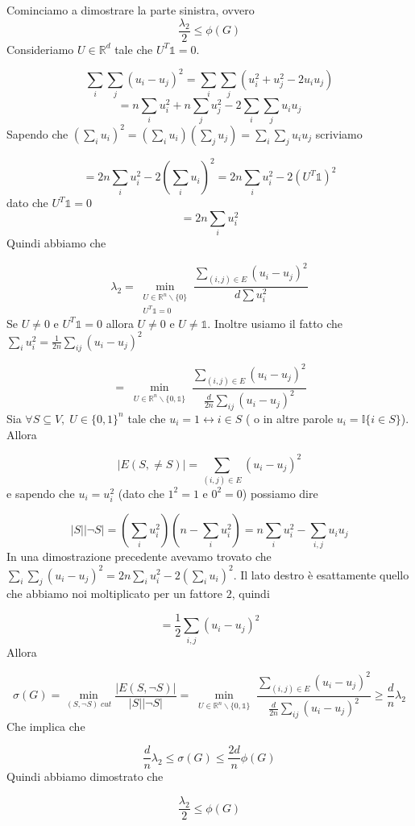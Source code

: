 \documentclass[12pt]{report}
\begin{document}
\begin{dimo}
Cominciamo a dimostrare la parte sinistra, ovvero $$\frac{\lambda_2}{2} \leq \phi(G)$$
Consideriamo $U \in \mathbb{R}^d $ tale che $U^T \mathds{1} = 0$.

$$\sum_i \sum_j (u_i - u_j)^2 = \sum_i \sum_j (u_i^2 + u_j^2 - 2u_i u_j)$$
$$= n \sum_i u_i^2 + n \sum_j u_j^2 - 2 \sum_i \sum_j u_i u_j$$
Sapendo che $(\sum_i u_i)^2 = (\sum_i u_i) (\sum_j u_j) = \sum_i \sum_j u_i u_j$ scriviamo

$$= 2n \sum_i u_i^2 - 2(\sum_i u_i)^2  = 2n \sum_i u_i^2 - 2(U^T \mathds{1})^2 $$
dato che $U^T \mathds{1} = 0$
$$= 2n \sum_i u_i^2$$
Quindi abbiamo che 

$$\lambda_2 = \min_{\substack{U \in \mathbb{R}^n \backslash \{0\} \\ U^T \mathds{1} = 0}} \frac{\sum_{(i,j) \in E} (u_i - u_j)^2}{d \sum u_i^2} $$
Se $U \neq 0$ e $U^T \mathds{1} = 0$ allora $U \neq 0$ e $U \neq \mathds{1}$. Inoltre usiamo il fatto che $\sum_i u_i^2 = \frac{1}{2n} \sum_{ij} (u_i-u_j)^2$

$$= \min_{\substack{U \in \mathbb{R}^n \backslash \{0, \mathds{1}\}}} \frac{\sum_{(i,j) \in E} (u_i - u_j)^2}{\frac{d}{2n} \sum_{ij} (u_i-u_j)^2}$$
Sia $\forall S \subseteq V, \; U \in \{0,1\}^n$ tale che $u_i = 1 \leftrightarrow i \in S$ ( o in altre parole $u_i = \mathds{I}\{i \in S\}$). Allora 

$$|E(S,\neq S)| = \sum_{(i,j) \in E}(u_i-u_j)^2$$
e sapendo che $u_i = u_i^2$ (dato che $1^2 = 1$ e $0^2 = 0$) possiamo dire

$$|S| |\neg S| = (\sum_i u_i^2) (n-\sum_i u_i^2) = n \sum_i u_i^2 - \sum_{i,j} u_i u_j$$
In una dimostrazione precedente avevamo trovato che 
$\sum_i \sum_j (u_i - u_j)^2 = 2n \sum_i u_i^2 - 2(\sum_i u_i)^2$. Il lato destro è esattamente quello che abbiamo noi moltiplicato per un fattore $2$, quindi

$$= \frac{1}{2} \sum_{i,j} (u_i - u_j)^2$$
Allora 

$$\sigma(G) = \min_{(S,\neg S)\; cut} \frac{|E(S,\neg S)|}{|S| |\neg S|} = \min_{\substack{U \in \mathbb{R}^n \backslash \{0, \mathds{1}\}}} \frac{\sum_{(i,j) \in E} (u_i - u_j)^2}{\frac{d}{2n} \sum_{ij} (u_i-u_j)^2} \geq \frac{d}{n} \lambda_2$$
Che implica che 

$$\frac{d}{n} \lambda_2 \leq \sigma(G) \leq \frac{2d}{n} \phi(G)$$
Quindi abbiamo dimostrato che 

$$\frac{\lambda_2}{2} \leq \phi(G)$$

\end{dimo}
\end{document}
